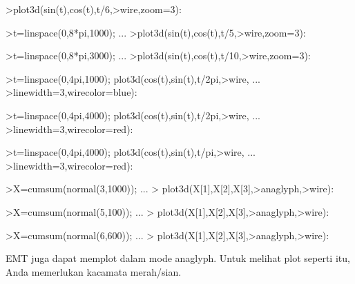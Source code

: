 \documentclass[a4paper,10pt]{article}
\begin{document}
\begin{eulernotebook}
\begin{eulercomment}
\begin{eulercomment}
\begin{eulerprompt}
>plot3d(sin(t),cos(t),t/6,>wire,zoom=3):
\end{eulerprompt}
\begin{eulerprompt}
>t=linspace(0,8*pi,1000); ...
>plot3d(sin(t),cos(t),t/5,>wire,zoom=3):
\end{eulerprompt}
\begin{eulerprompt}
>t=linspace(0,8*pi,3000); ...
>plot3d(sin(t),cos(t),t/10,>wire,zoom=3):
\end{eulerprompt}
\begin{eulerprompt}
>t=linspace(0,4pi,1000); plot3d(cos(t),sin(t),t/2pi,>wire, ...
>linewidth=3,wirecolor=blue):
\end{eulerprompt}
\begin{eulerprompt}
>t=linspace(0,4pi,4000); plot3d(cos(t),sin(t),t/2pi,>wire, ...
>linewidth=3,wirecolor=red):
\end{eulerprompt}
\begin{eulerprompt}
>t=linspace(0,4pi,4000); plot3d(cos(t),sin(t),t/pi,>wire, ...
>linewidth=3,wirecolor=red):
\end{eulerprompt}
\begin{eulerprompt}
>X=cumsum(normal(3,1000)); ...
> plot3d(X[1],X[2],X[3],>anaglyph,>wire):
\end{eulerprompt}
\begin{eulerprompt}
>X=cumsum(normal(5,100)); ...
> plot3d(X[1],X[2],X[3],>anaglyph,>wire):
\end{eulerprompt}
\begin{eulerprompt}
>X=cumsum(normal(6,600)); ...
> plot3d(X[1],X[2],X[3],>anaglyph,>wire):
\end{eulerprompt}
\begin{eulercomment}
EMT juga dapat memplot dalam mode anaglyph. Untuk melihat plot seperti
itu, Anda memerlukan kacamata merah/sian.
\end{eulercomment}
\begin{eulerprompt}

\end{eulerprompt}
\end{eulercomment}
\end{eulercomment}
\end{eulernotebook}
\end{document}
